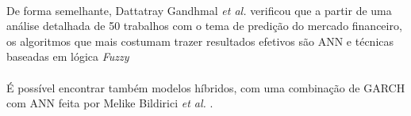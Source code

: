 \paragraph{} De forma semelhante, Dattatray Gandhmal \textit{et al.} \cite{gandhmal2019systematic} verificou que a partir de uma análise detalhada de 50 trabalhos com o tema de predição do mercado financeiro, os algoritmos que mais costumam trazer resultados efetivos são ANN e técnicas baseadas em lógica \textit{Fuzzy}

\paragraph{} É possível encontrar também modelos híbridos, com uma combinação de GARCH com ANN feita por Melike Bildirici \textit{et al.} \cite{bildirici2009improving}.